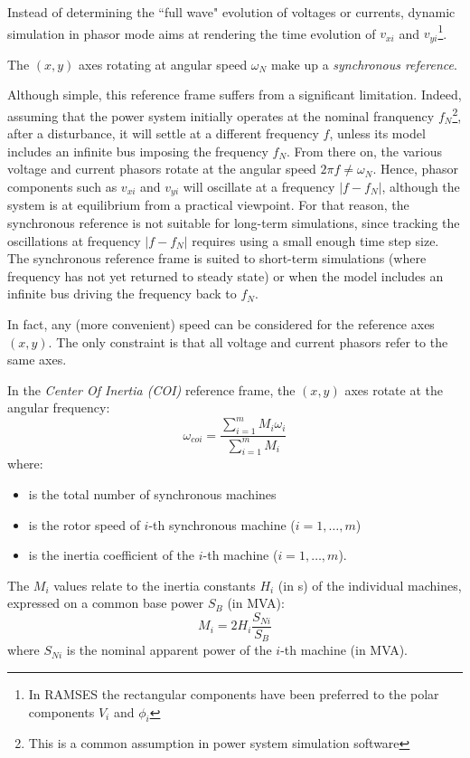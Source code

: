 Instead of determining the ``full wave" evolution of voltages or currents, dynamic simulation in phasor mode aims at rendering the time evolution of $v_{xi}$ and $v_{yi}$\footnote{In RAMSES the rectangular components have been preferred to the polar components $V_i$ and $\phi_i$}.

The $(x,y)$ axes rotating at angular speed $\omega_N$ make up a {\em synchronous reference}.

Although simple, this reference frame suffers from a significant limitation. Indeed, assuming that the power system initially operates at the nominal franquency $f_N$\footnote{This is a common assumption in power system simulation software}, after a disturbance, it will settle at a different frequency $f$, unless its model includes an infinite bus imposing the frequency $f_N$. From there on, the various voltage and current phasors rotate at the angular speed $2 \pi f \ne \omega_N$. Hence, phasor components such as $v_{xi}$ and $v_{yi}$ will oscillate at a frequency $|f-f_N|$, although the system is at equilibrium from a practical viewpoint. For that reason, the synchronous reference is not suitable for long-term simulations, since tracking the oscillations at frequency $|f-f_N|$ requires using a small enough time step size. The synchronous reference frame is suited to short-term simulations (where frequency has not yet returned to steady state) or when the model includes an infinite bus driving the frequency back to $f_N$.

In fact, any (more convenient) speed can be considered for the reference axes $(x,y)$. The only constraint is that all voltage and current phasors refer to the same axes. 

In the {\em Center Of Inertia (COI)} reference frame, the $(x, y)$ axes rotate at the angular frequency:
\begin{equation}\label{omegacoi}
\omega_{coi} = \frac{\sum_{i=1}^m M_i \omega_i}{\sum_{i=1}^m M_i}
\end{equation}
where:
\begin{itemize}
\item[$m$] is the total number of synchronous machines
\item[$\omega_i$] is the rotor speed of $i$-th synchronous machine ($i=1,\ldots,m$)
\item[$M_i$] is the inertia coefficient of the $i$-th machine ($i=1,\ldots,m$).
\end{itemize}
The $M_i$ values relate to the inertia constants $H_i$ (in s) of the individual machines, expressed on a common base power $S_B$ (in MVA):
\[ M_i = 2 H_i \frac{S_{Ni}}{S_B} \]
where $S_{Ni}$ is the nominal apparent power of the $i$-th machine (in MVA).

